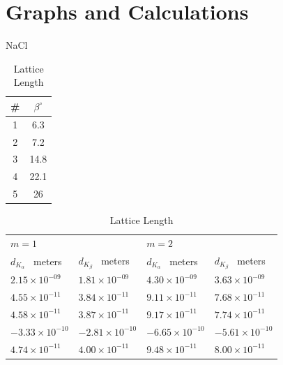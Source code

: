 \documentclass{amsart}
\begin{document}
\renewcommand{\arraystretch}{1.1}
\section{Graphs and Calculations}

\begin{table}[H]
    \begin{minipage}{.25\textwidth}
        \centering
        \caption{NaCl}
        \vspace{13pt}
        \begin{tabular}{c|c}
            \# & $\beta^{\circ}$ \\ \hline
            1    & 6.3             \\
            2    & 7.2             \\
            3    & 14.8            \\
            4    & 22.1            \\
            5    & 26
        \end{tabular}
    \end{minipage}
    \begin{minipage}{.7\textwidth}
            \centering
            \caption{Lattice Length}
            \label{my-label}
            \begin{tabular}{llll}
                $m=1$                               &               &$m=2$                              &               \\
                \multicolumn{1}{l|}{$d_{K_{\alpha}}$ \ meters}  & $d_{K_{\beta }}$ \ meters & \multicolumn{1}{|l|}{$d_{K_{\alpha}}$ \ meters} & $d_{K_{\beta }}$ \ meters\\ \hline
                \multicolumn{1}{l|}{$ 2.15 \times10^{-09}$}      & $ 1.81 \times10^{-09} $     & \multicolumn{1}{|l|}{$ 4.30 \times10^{-09}$}     & $ 3.63 \times10^{-09} $     \\
                \multicolumn{1}{l|}{$ 4.55 \times10^{-11}$}      & $ 3.84 \times10^{-11} $     & \multicolumn{1}{|l|}{$ 9.11 \times10^{-11}$}     & $ 7.68 \times10^{-11} $     \\
                \multicolumn{1}{l|}{$ 4.58 \times10^{-11}$}      & $ 3.87 \times10^{-11} $     & \multicolumn{1}{|l|}{$ 9.17 \times10^{-11}$}     & $ 7.74 \times10^{-11} $     \\
                \multicolumn{1}{l|}{$-3.33 \times10^{-10}$}      & $-2.81 \times10^{-10} $     & \multicolumn{1}{|l|}{$-6.65 \times10^{-10}$}     & $-5.61 \times10^{-10} $     \\
                \multicolumn{1}{l|}{$ 4.74 \times10^{-11}$}      & $ 4.00 \times10^{-11} $     & \multicolumn{1}{|l|}{$ 9.48 \times10^{-11}$}     & $ 8.00 \times10^{-11} $     \\
            \end{tabular}
    \end{minipage}
\end{table}
\end{document}
